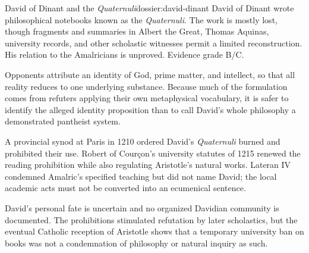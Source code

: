 \begin{heresydossier}{David of Dinant and the \emph{Quaternuli}}{dossier:david-dinant}
\objectfield David of Dinant wrote philosophical notebooks known as the \emph{Quaternuli}. The work is mostly lost, though fragments and summaries in Albert the Great, Thomas Aquinas, university records, and other scholastic witnesses permit a limited reconstruction. His relation to the Amalricians is unproved. Evidence grade B/C.

\propositionfield Opponents attribute an identity of God, prime matter, and intellect, so that all reality reduces to one underlying substance. Because much of the formulation comes from refuters applying their own metaphysical vocabulary, it is safer to identify the alleged identity proposition than to call David's whole philosophy a demonstrated pantheist system.

\responsefield A provincial synod at Paris in 1210 ordered David's \emph{Quaternuli} burned and prohibited their use. Robert of Cour\c{c}on's university statutes of 1215 renewed the reading prohibition while also regulating Aristotle's natural works. Lateran IV condemned Amalric's specified teaching but did not name David; the local academic acts must not be converted into an ecumenical sentence.

\aftermathfield David's personal fate is uncertain and no organized Davidian community is documented. The prohibitions stimulated refutation by later scholastics, but the eventual Catholic reception of Aristotle shows that a temporary university ban on books was not a condemnation of philosophy or natural inquiry as such.
\end{heresydossier}

